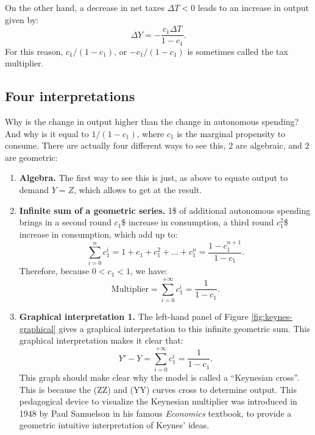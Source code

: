 \documentclass[]{book}
\theoremstyle{definition}
\theoremstyle{definition}
\theoremstyle{definition}
\theoremstyle{remark}
\begin{document}
On the other hand, a decrease in net taxes \(\Delta T<0\) leads to an
increase in output given by:
\[\Delta Y = - \frac{c_1 \Delta T}{1-c_{1}}.\] For this reason,
\(c_1/(1-c_1)\), or \(-c_1/(1-c_1)\) is sometimes called the tax
multiplier.

\subsection{Four interpretations}\label{four-interpretations}

Why is the change in output higher than the change in autonomous
spending? And why is it equal to \(1/(1-c_1)\), where \(c_1\) is the
marginal propensity to consume. There are actually four different ways
to see this, 2 are algebraic, and 2 are geometric:

\begin{enumerate}
\def\labelenumi{\arabic{enumi}.}
\item
  \textbf{Algebra.} The first way to see this is just, as above to
  equate output to demand \(Y=Z\), which allows to get at the result.
\item
  \textbf{Infinite sum of a geometric series.} 1\$ of additional
  autonomous spending brings in a second round \(c_{1}\)\$ increase in
  consumption, a third round \(c_{1}^{2}\)\$ increase in consumption,
  which add up to:
  \[\sum_{i=0}^{n}c_{1}^{i}=1+c_{1}+c_{1}^{2}+...+c_{1}^{n}=\frac{1-c_{1}^{n+1}}{1-c_{1}}.\]
  Therefore, because \(0<c_{1}<1\), we have:
  \[\text{Multiplier}=\sum_{i=0}^{+\infty}c_{1}^{i}=\frac{1}{1-c_{1}}.\]
\item
  \textbf{Graphical interpretation 1.} The left-hand panel of Figure
  \ref{fig:keynes-graphical} gives a graphical interpretation to this
  infinite geometric sum. This graphical interpretation makes it clear
  that: \[Y'-Y=\sum_{i=0}^{+\infty}c_{1}^{i}=\frac{1}{1-c_{1}}.\] This
  graph should make clear why the model is called a ``Keynesian cross''.
  This is because the (ZZ) and (YY) curves cross to determine output.
  This pedagogical device to visualize the Keynesian multiplier was
  introduced in 1948 by Paul Samuelson in his famous \emph{Economics}
  textbook, to provide a geometric intuitive interpretation of Keynes'
  ideas.
\end{enumerate}
\end{document}
